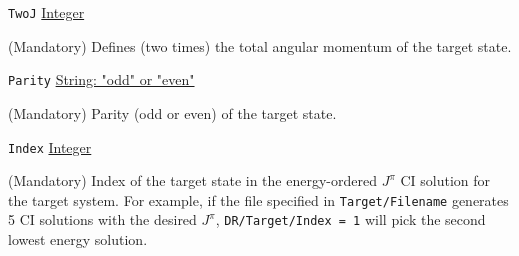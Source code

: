 \documentclass{report}
\begin{document}
\texttt{TwoJ} \uline{Integer}
\begin{adjustwidth}{1cm}{}
(Mandatory) Defines (two times) the total angular momentum of the target state.
\end{adjustwidth}

\texttt{Parity} \uline{String: "odd" or "even"}
\begin{adjustwidth}{1cm}{}
(Mandatory) Parity (odd or even) of the target state.
\end{adjustwidth}

\texttt{Index} \uline{Integer}
\begin{adjustwidth}{1cm}{}
(Mandatory) Index of the target state in the energy-ordered $J^{\pi}$ CI solution for the target system. 
For example, if the file specified in \texttt{Target/Filename} generates 5 CI solutions with the desired
$J^{\pi}$, \texttt{DR/Target/Index = 1} will pick the second lowest energy solution.
\end{adjustwidth}
\end{document}
